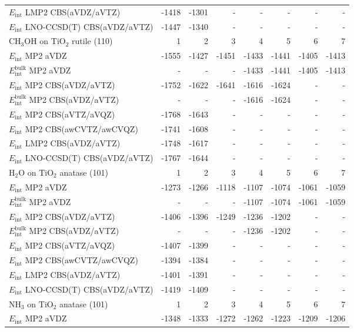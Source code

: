\begin{longtable}{lrrrrrrr}
$E_\textrm{int}$ LMP2 CBS(aVDZ/aVTZ) & -1418 & -1301 & - & - & - & - & - \\
$E_\textrm{int}$ LNO-CCSD(T) CBS(aVDZ/aVTZ) & -1447 & -1340 & - & - & - & - & - \\
\toprule
CH$_3$OH on TiO$_2$ rutile (110) & 1 & 2 & 3 & 4 & 5 & 6 & 7 \\ 
\midrule
$E_\textrm{int}$ MP2 aVDZ & -1555 & -1427 & -1451 & -1433 & -1441 & -1405 & -1413 \\
$E_\textrm{int}^\textrm{bulk}$ MP2 aVDZ & - & - & - & -1433 & -1441 & -1405 & -1413 \\
$E_\textrm{int}$ MP2 CBS(aVDZ/aVTZ) & -1752 & -1622 & -1641 & -1616 & -1624 & - & - \\
$E_\textrm{int}^\textrm{bulk}$ MP2 CBS(aVDZ/aVTZ) & - & - & - & -1616 & -1624 & - & - \\
$E_\textrm{int}$ MP2 CBS(aVTZ/aVQZ) & -1768 & -1643 & - & - & - & - & - \\
$E_\textrm{int}$ MP2 CBS(awCVTZ/awCVQZ) & -1741 & -1608 & - & - & - & - & - \\
$E_\textrm{int}$ LMP2 CBS(aVDZ/aVTZ) & -1748 & -1617 & - & - & - & - & - \\
$E_\textrm{int}$ LNO-CCSD(T) CBS(aVDZ/aVTZ) & -1767 & -1644 & - & - & - & - & - \\
\toprule
H$_2$O on TiO$_2$ anatase (101) & 1 & 2 & 3 & 4 & 5 & 6 & 7 \\ 
\midrule
$E_\textrm{int}$ MP2 aVDZ & -1273 & -1266 & -1118 & -1107 & -1074 & -1061 & -1059 \\
$E_\textrm{int}^\textrm{bulk}$ MP2 aVDZ & - & - & - & -1107 & -1074 & -1061 & -1059 \\
$E_\textrm{int}$ MP2 CBS(aVDZ/aVTZ) & -1406 & -1396 & -1249 & -1236 & -1202 & - & - \\
$E_\textrm{int}^\textrm{bulk}$ MP2 CBS(aVDZ/aVTZ) & - & - & - & -1236 & -1202 & - & - \\
$E_\textrm{int}$ MP2 CBS(aVTZ/aVQZ) & -1407 & -1399 & - & - & - & - & - \\
$E_\textrm{int}$ MP2 CBS(awCVTZ/awCVQZ) & -1394 & -1384 & - & - & - & - & - \\
$E_\textrm{int}$ LMP2 CBS(aVDZ/aVTZ) & -1401 & -1391 & - & - & - & - & - \\
$E_\textrm{int}$ LNO-CCSD(T) CBS(aVDZ/aVTZ) & -1419 & -1409 & - & - & - & - & - \\
\toprule
NH$_3$ on TiO$_2$ anatase (101) & 1 & 2 & 3 & 4 & 5 & 6 & 7 \\ 
\midrule
$E_\textrm{int}$ MP2 aVDZ & -1348 & -1333 & -1272 & -1262 & -1223 & -1209 & -1206 \\

\end{longtable}
